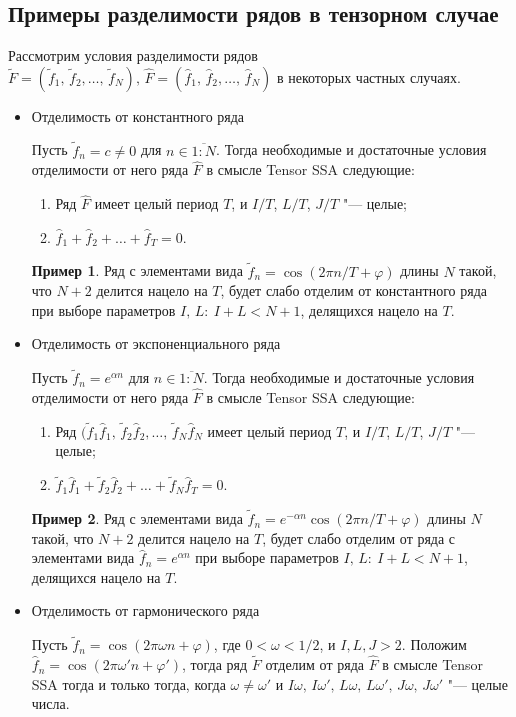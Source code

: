\documentclass[specialist,
    substylefile = spbu_report.rtx,
    subf,href,colorlinks=true, 12pt]{disser}
\theoremstyle{plain}
\theoremstyle{definition}
\newtheorem{example}{Пример}[section]
\theoremstyle{remark}
\begin{document}
    \subsection{Примеры разделимости рядов в тензорном случае}\label{subsec:separation-example}
    Рассмотрим условия разделимости рядов $\tilde{F}=(\tilde{f}_{1},\, \tilde{f}_{2},\ldots,\, \tilde{f}_{N}),\, \hat{F}=
    (\hat{f}_{1},\, \hat{f}_{2},\ldots,\, \hat{f}_{N})$ в некоторых частных случаях.
    \begin{itemize}
        \item Отделимость от константного ряда

        Пусть $\tilde{f}_n=c\ne 0$ для $n\in\overline{1:N}$.
        Тогда необходимые и достаточные условия отделимости от него ряда $\hat{F}$ в смысле Tensor SSA следующие:
        \begin{enumerate}
            \item Ряд $\hat{F}$ имеет целый период $T$, и $I/T$, $L/T$, $J/T$ "--- целые;
            \item $\hat{f}_{1}+\hat{f}_2+\ldots+\hat{f}_T=0$.
        \end{enumerate}
        \begin{example}
            Ряд с элементами вида $\tilde{f}_n=\cos(2\pi n / T + \varphi)$ длины $N$ такой, что $N+2$ делится нацело на
            $T$, будет слабо отделим от константного ряда при выборе параметров $I,\, L:\: I+L< N+1$, делящихся нацело на $T$.
        \end{example}
        \item Отделимость от экспоненциального ряда

        Пусть $\tilde{f}_n=e^{\alpha n}$ для $n\in\overline{1:N}$.
        Тогда необходимые и достаточные условия отделимости от него ряда $\hat{F}$ в смысле Tensor SSA следующие:
        \begin{enumerate}
            \item Ряд $(\tilde{f}_{1}\hat{f}_{1},\, \tilde{f}_{2}\hat{f}_{2},\ldots,\, \tilde{f}_{N}\hat{f}_{N}$
            имеет целый период $T$, и $I/T$, $L/T$, $J/T$ "--- целые;
            \item $\tilde{f}_{1}\hat{f}_{1}+\tilde{f}_{2}\hat{f}_2+\ldots+\tilde{f}_{N}\hat{f}_T=0$.
        \end{enumerate}
        \begin{example}
            Ряд с элементами вида $\tilde{f}_n=e^{-\alpha n}\cos(2\pi n / T + \varphi)$ длины $N$ такой, что $N+2$ делится нацело на
            $T$, будет слабо отделим от ряда с элементами вида $\hat{f}_n=e^{\alpha n}$ при выборе параметров $I,\, L:\: I+L< N+1$, делящихся нацело на $T$.
        \end{example}
        \item Отделимость от гармонического ряда

        Пусть $\tilde{f}_n=\cos(2\pi \omega n + \varphi)$, где $0 < \omega < 1/2$, и $I, L, J > 2$.
        Положим $\hat{f}_n=\cos(2\pi \omega' n + \varphi')$,
        тогда ряд $\tilde{F}$ отделим от ряда $\hat{F}$ в смысле Tensor SSA тогда и только тогда, когда $\omega\ne\omega'$
        и $I\omega,\, I\omega',\, L\omega,\, L\omega',\, J\omega,\, J\omega'$ "--- целые числа.
    \end{itemize}
\end{document}
